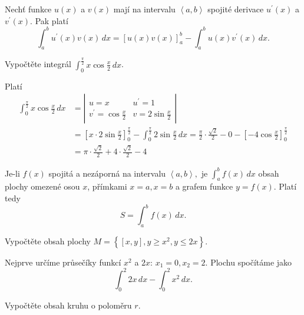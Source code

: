 \begin{veta}
Nechť funkce $u(x)$ a $v(x)$ mají na intervalu $\left < a,b \right > $ spojité derivace
$u^\prime (x)$ a $v^\prime (x)$. Pak platí
$$\int_a ^b u^\prime (x)v(x)\, dx = \left [ u(x)v(x) \right ]_a^b -\int _a^b u(x)v^\prime(x)\,dx.$$
\end{veta}

\begin{priklad}
Vypočtěte integrál $\int _0^{\frac{\pi}{2}}x \cos \frac{x}{2}\, dx$.
\end{priklad}

\begin{reseni}
Platí
\begin{align*}
\int _0^{\frac{\pi}{2}}x \cos \frac{x}{2}\, dx &= \left | \begin{array}{ll}
    u=x & u^\prime = 1 \\
    v^\prime = \cos \frac{x}{2} & v = 2\sin \frac{x}{2}
\end{array}   \right | \\
& =\left [ x\cdot2\sin \frac{x}{2} \right ]_0^{\frac{\pi}{2}}-\int_0^{\frac{\pi}{2}}2\sin \frac{x}{2}\, dx =\frac{\pi}{2}\cdot \frac{\sqrt{2} }{2}-0-\left [ -4\cos \frac{x}{2} \right ]_0^{\frac{\pi}{2}}\\
&= \pi \cdot \frac{\sqrt{2} }{2}+4\cdot \frac{\sqrt{2} }{2}-4
\end{align*}
\end{reseni}

\begin{pozn}
    Je-li $f(x)$ spojitá a nezáporná na intervalu $\left < a,b \right > ,$ je
    $\int_a ^b f(x)\, dx$ obsah plochy omezené osou $x$, přímkami $x=a, x=b$ a
    grafem funkce $y=f(x)$. Platí tedy
    $$S=\int_a^b f(x)\, dx.$$
\end{pozn}

\begin{priklad}
Vypočtěte obsah plochy $M=\left \{ [x,y], y \geq  x^2 , y \leq 2x\right \} $.
\end{priklad}

\begin{reseni}
Nejprve určíme průsečíky funkcí $x^2$ a $2x$: $x_1=0,x_2=2$. Plochu spočítáme
jako
$$\int_0^2 2x\, dx - \int_0^2 x^2 \, dx.$$
\end{reseni}

\begin{priklad}
Vypočtěte obsah kruhu o poloměru $r$.
\end{priklad}

